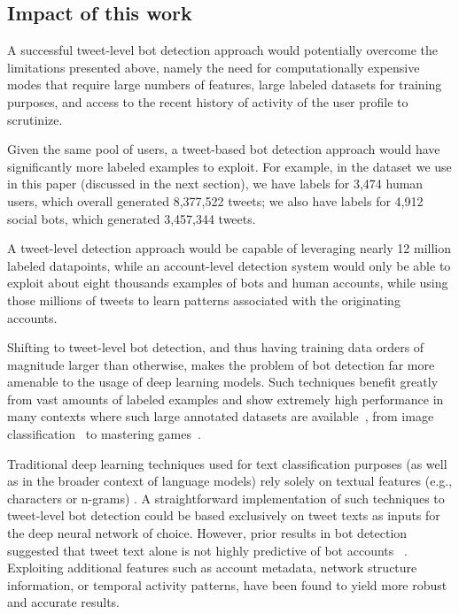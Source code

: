 \subsection{Impact of this work}
A successful tweet-level bot detection approach would potentially overcome the  limitations presented above, namely the need for computationally expensive modes that require large numbers of features, large labeled datasets for training purposes, and access to the recent history of activity of the user profile to scrutinize. 

Given the same pool of users, a tweet-based bot detection approach would have significantly more labeled examples to exploit. For example, in the dataset we use in this paper (discussed in the next section), we have labels for 3,474 human users, which overall generated 8,377,522 tweets; we also have labels for 4,912 social bots, which generated 3,457,344 tweets. 

A tweet-level detection approach would be capable of leveraging nearly 12 million labeled datapoints, while an account-level detection system would only be able to exploit about eight thousands examples of bots and human accounts, while using those millions of tweets to learn patterns associated with the originating accounts. 

Shifting to tweet-level bot detection, and thus having training data orders of magnitude larger than otherwise, makes the problem of bot detection far more amenable to the usage of deep learning models. Such techniques benefit greatly from vast amounts of labeled examples and show extremely high performance in many contexts where such large annotated datasets are available~\cite{lecun2015deep}, from image classification~\cite{krizhevsky2012imagenet} to mastering games~\cite{mnih2013playing,mnih2015human,silver2016mastering}.

Traditional deep learning techniques used for text classification purposes (as well as in the broader context of language models) rely solely on textual features (e.g., characters or n-grams) \citet{john2017survey}. A straightforward implementation of such techniques to tweet-level bot detection could be based exclusively on tweet texts as inputs for the deep neural network of choice.
However, prior results in bot detection suggested that tweet text alone is not highly predictive of bot accounts ~\cite{ferrara2016rise}. Exploiting additional  features such as account metadata, network structure information, or temporal activity patterns, have been found to yield more robust and accurate results. 

